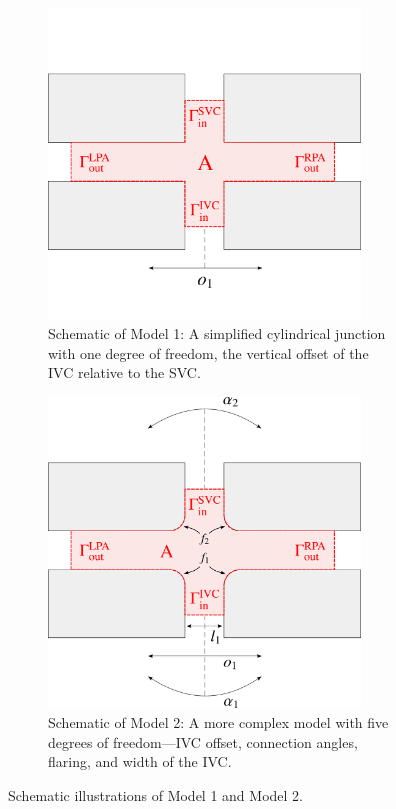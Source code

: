 \begin{figure}[h]
	\begin{subfigure}{0.48\textwidth}
		\centering
		\includegraphics[width=0.91\textwidth, trim={0 0 0 0}]{figures/model1.pdf}
		\caption[Simplified Cylindrical Junction]{Schematic of Model 1: A simplified cylindrical junction with one degree of freedom, the vertical offset of the IVC relative to the SVC.}
		\label{fig:model1_schematic}
	\end{subfigure}\hfill%
	\begin{subfigure}{0.48\textwidth}
		\centering
		\includegraphics[width=0.91\textwidth]{figures/model2.pdf}
		\caption[Complex Geometric Model]{Schematic of Model 2: A more complex model with five degrees of freedom—IVC offset, connection angles, flaring, and width of the IVC.}
		\label{fig:model2_schematic}
	\end{subfigure}
	\caption{Schematic illustrations of Model 1 and Model 2.}
	\label{fig:model schemas}
\end{figure}
